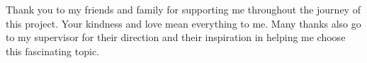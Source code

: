 Thank you to my friends and family for supporting me throughout the journey of this project. Your kindness and love mean everything to me. Many thanks also go to my supervisor for their direction and their inspiration in helping me choose this fascinating topic.